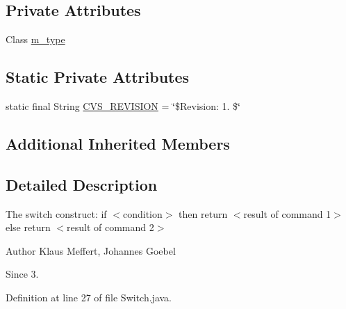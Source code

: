 \subsection*{Private Attributes}
\begin{DoxyCompactItemize}
\item 
Class \hyperlink{classorg_1_1jgap_1_1gp_1_1function_1_1_switch_a0a171b818c02eb9347b9cff967ce0e84}{m\-\_\-type}
\end{DoxyCompactItemize}
\subsection*{Static Private Attributes}
\begin{DoxyCompactItemize}
\item 
static final String \hyperlink{classorg_1_1jgap_1_1gp_1_1function_1_1_switch_aa9b7dd6ddaf13d26fe615565313844d6}{C\-V\-S\-\_\-\-R\-E\-V\-I\-S\-I\-O\-N} = \char`\"{}\$Revision\-: 1. \$\char`\"{}
\end{DoxyCompactItemize}
\subsection*{Additional Inherited Members}


\subsection{Detailed Description}
The switch construct\-: if $<$condition$>$ then return $<$result of command 1$>$ else return $<$result of command 2$>$

\begin{DoxyAuthor}{Author}
Klaus Meffert, Johannes Goebel 
\end{DoxyAuthor}
\begin{DoxySince}{Since}
3. 
\end{DoxySince}


Definition at line 27 of file Switch.\-java.



